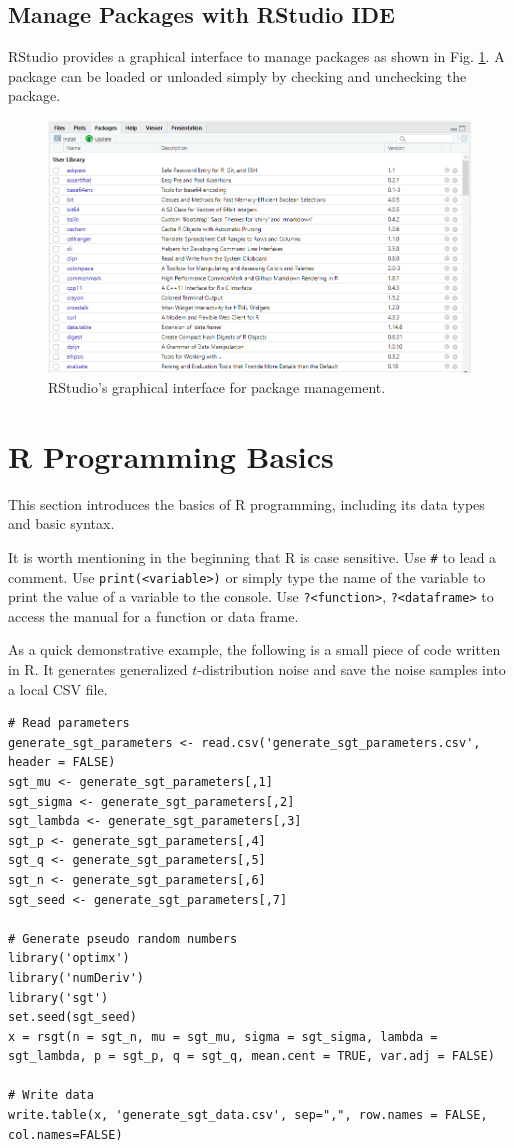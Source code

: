 \subsection{Manage Packages with RStudio IDE}

RStudio provides a graphical interface to manage packages as shown in Fig. \ref{ch:r1:fig:rstudio_package_management}. A package can be loaded or unloaded simply by checking and unchecking the package.
\begin{figure}
\centering
\includegraphics[width=350pt]{chapters/ch-r/figures/rstudio_package_management.png}
\caption{RStudio's graphical interface for package management.} \label{ch:r1:fig:rstudio_package_management}
\end{figure}

\section{R Programming Basics} \label{ch:r1:sec:rprogramming}

This section introduces the basics of R programming, including its data types and basic syntax.

It is worth mentioning in the beginning that R is case sensitive. Use \verb|#| to lead a comment. Use \verb|print(<variable>)| or simply type the name of the variable to print the value of a variable to the console. Use \verb|?<function>|, \verb|?<dataframe>| to access the manual for a function or data frame.

As a quick demonstrative example, the following is a small piece of code written in R. It generates generalized $t$-distribution noise and save the noise samples into a local CSV file.
\begin{lstlisting}
# Read parameters
generate_sgt_parameters <- read.csv('generate_sgt_parameters.csv', header = FALSE)
sgt_mu <- generate_sgt_parameters[,1]
sgt_sigma <- generate_sgt_parameters[,2]
sgt_lambda <- generate_sgt_parameters[,3]
sgt_p <- generate_sgt_parameters[,4]
sgt_q <- generate_sgt_parameters[,5]
sgt_n <- generate_sgt_parameters[,6]
sgt_seed <- generate_sgt_parameters[,7]

# Generate pseudo random numbers
library('optimx')
library('numDeriv')
library('sgt')
set.seed(sgt_seed)
x = rsgt(n = sgt_n, mu = sgt_mu, sigma = sgt_sigma, lambda = sgt_lambda, p = sgt_p, q = sgt_q, mean.cent = TRUE, var.adj = FALSE)

# Write data
write.table(x, 'generate_sgt_data.csv', sep=",", row.names = FALSE, col.names=FALSE)
\end{lstlisting}

